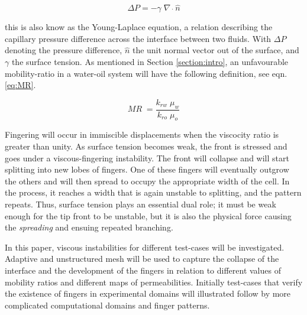 \documentclass[preprint,authoryear,12pt]{elsarticle}
\begin{document}
\begin{equation}
\Delta P= - \gamma \; \nabla \; \dot \; \hat{n} 
\label{eq:pressure_dif} 
\end{equation}

\noindent this is also know as the Young-Laplace equation, a relation describing the capillary pressure difference across the interface between two fluids. With $\Delta P$ denoting the pressure difference, $\hat{n}$ the unit normal vector out of the surface, and $\gamma$ the surface tension. As mentioned in Section \ref{section:intro}, an unfavourable mobility-ratio in a water-oil system will have the following definition, see eqn.\ref{eq:MR}.

\begin{equation}
 MR \; = \frac{k_{rw} \; \mu_{w}}{k_{ro} \; \mu_{o}} 
\label{eq:MR}
\end{equation}

\noindent Fingering will occur in immiscible displacements when the viscocity ratio is greater than unity. %
As surface tension becomes weak, the front is stressed and goes under a viscous-fingering instability. The front will collapse and will start splitting into new lobes of fingers. One of these fingers will eventually outgrow the others and will then spread to occupy the appropriate width of the cell. In the process, it reaches a width that is again unstable to splitting, and the pattern repeats. Thus, surface tension plays an essential dual role; it must be weak enough for the tip front to be unstable, but it is also the physical force causing the \textit{spreading} and ensuing repeated branching.

In  this paper, viscous instabilities for different test-cases will be investigated. Adaptive and unstructured mesh will be used to capture the collapse of the interface and the development of the fingers in relation to different values of mobility ratios and different maps of permeabilities. Initially test-cases that verify the existence of fingers in experimental domains will illustrated follow by more complicated computational domains and finger patterns.  
\end{document}
